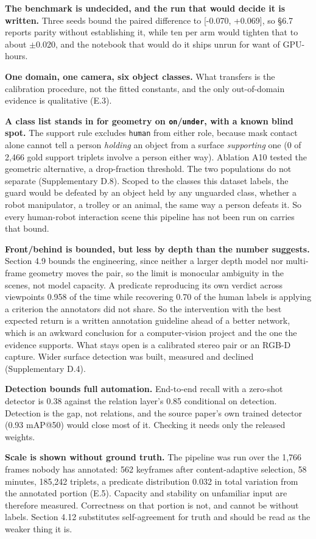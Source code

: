\textbf{The benchmark is undecided, and the run that would decide it is written.} Three seeds bound the paired difference to [-0.070, +0.069], so \S{}6.7 reports parity without establishing it, while ten per arm would tighten that to about $\pm$0.020, and the notebook that would do it ships unrun for want of GPU-hours.

\textbf{One domain, one camera, six object classes.} What transfers is the calibration procedure, not the fitted constants, and the only out-of-domain evidence is qualitative (E.3).

\textbf{A class list stands in for geometry on \texttt{on}/\texttt{under}, with a known blind spot.} The support rule excludes \texttt{human} from either role, because mask contact alone cannot tell a person \textit{holding} an object from a surface \textit{supporting} one (0 of 2,466 gold support triplets involve a person either way). Ablation A10 tested the geometric alternative, a drop-fraction threshold. The two populations do not separate (Supplementary D.8). Scoped to the classes this dataset labels, the guard would be defeated by an object held by any unguarded class, whether a robot manipulator, a trolley or an animal, the same way a person defeats it. So every human-robot interaction scene this pipeline has not been run on carries that bound.

\textbf{Front/behind is bounded, but less by depth than the number suggests.} Section 4.9 bounds the engineering, since neither a larger depth model nor multi-frame geometry moves the pair, so the limit is monocular ambiguity in the scenes, not model capacity. A predicate reproducing its own verdict across viewpoints 0.958 of the time while recovering 0.70 of the human labels is applying a criterion the annotators did not share. So the intervention with the best expected return is a written annotation guideline ahead of a better network, which is an awkward conclusion for a computer-vision project and the one the evidence supports. What stays open is a calibrated stereo pair or an RGB-D capture. Wider surface detection was built, measured and declined (Supplementary D.4).

\textbf{Detection bounds full automation.} End-to-end recall with a zero-shot detector is 0.38 against the relation layer's 0.85 conditional on detection. Detection is the gap, not relations, and the source paper's own trained detector (0.93 mAP@50) would close most of it. Checking it needs only the released weights.

\textbf{Scale is shown without ground truth.} The pipeline was run over the 1,766 frames nobody has annotated: 562 keyframes after content-adaptive selection, 58 minutes, 185,242 triplets, a predicate distribution 0.032 in total variation from the annotated portion (E.5). Capacity and stability on unfamiliar input are therefore measured. Correctness on that portion is not, and cannot be without labels. Section 4.12 substitutes self-agreement for truth and should be read as the weaker thing it is.

